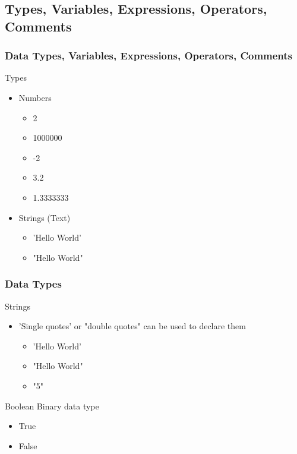 \documentclass[10pt, a4paper]{beamer} %
\begin{document}
\subsection{Types, Variables, Expressions, Operators, Comments} %
\label{sub:Types_variables_expressions_operators_comments}

\begin{frame}[c]\frametitle{Data Types, Variables, Expressions, Operators, Comments}
\begin{block}{Types}
    \begin{itemize}
        \item Numbers
        \begin{itemize}
            \item 2
            \item 1000000
            \item -2
            \item 3.2
            \item 1.3333333
        \end{itemize}
        \item Strings (Text)
        \begin{itemize}
            \item {\color{blue}'Hello World'}
            \item {\color{red}"Hello World"}
        \end{itemize}
    \end{itemize}
\end{block}
    
\end{frame}

\begin{frame}[c]\frametitle{Data Types}
    \begin{block}{Strings}
    \begin{itemize}
        \item {\color{blue} 'Single quotes'} or {\color{red} "double quotes"} can be used to declare them
        \begin{itemize}
            \item 'Hello World'
            \item "Hello World"
            \item "5"
        \end{itemize}
    \end{itemize}
    \end{block}
    \begin{block}{Boolean}
    Binary data type
        \begin{itemize}
            \item True
            \item False
        \end{itemize}
    \end{block}

\end{frame}
\end{document}

